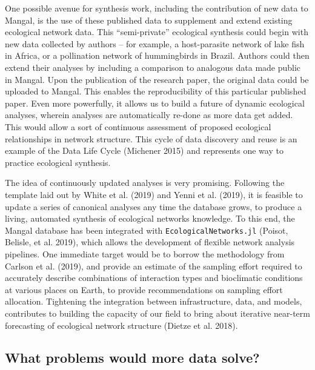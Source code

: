 \documentclass[10pt,oneside]{article}
\begin{document}
One possible avenue for synthesis work, including the contribution of
new data to Mangal, is the use of these published data to supplement and
extend existing ecological network data. This ``semi-private''
ecological synthesis could begin with new data collected by authors --
for example, a host-parasite network of lake fish in Africa, or a
pollination network of hummingbirds in Brazil. Authors could then extend
their analyses by including a comparison to analogous data made public
in Mangal. Upon the publication of the research paper, the original data
could be uploaded to Mangal. This enables the reproducibility of this
particular published paper. Even more powerfully, it allows us to build
a future of dynamic ecological analyses, wherein analyses are
automatically re-done as more data get added. This would allow a sort of
continuous assessment of proposed ecological relationships in network
structure. This cycle of data discovery and reuse is an example of the
Data Life Cycle (Michener 2015) and represents one way to practice
ecological synthesis.

The idea of continuously updated analyses is very promising. Following
the template laid out by White et al. (2019) and Yenni et al. (2019), it
is feasible to update a series of canonical analyses any time the
database grows, to produce a living, automated synthesis of ecological
networks knowledge. To this end, the Mangal database has been integrated
with \texttt{EcologicalNetworks.jl} (Poisot, Belisle, et al. 2019),
which allows the development of flexible network analysis pipelines. One
immediate target would be to borrow the methodology from Carlson et al.
(2019), and provide an estimate of the sampling effort required to
accurately describe combinations of interaction types and bioclimatic
conditions at various places on Earth, to provide recommendations on
sampling effort allocation. Tightening the integration between
infrastructure, data, and models, contributes to building the capacity
of our field to bring about iterative near-term forecasting of
ecological network structure (Dietze et al. 2018).

\hypertarget{what-problems-would-more-data-solve}{%
\subsection{What problems would more data
solve?}\label{what-problems-would-more-data-solve}}
\end{document}
